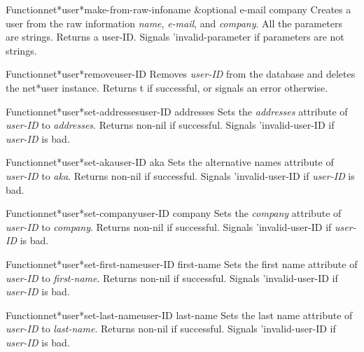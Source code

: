 \begin{functiondoc}{Function}{net*user*make-from-raw-info}{name \&optional e-mail company}
Creates a user from the raw information {\em name}, {\em e-mail}, and {\em company}.
All the parameters are strings.
Returns a user-ID.
Signals 'invalid-parameter if parameters are not strings.
\end{functiondoc}

\begin{functiondoc}{Function}{net*user*remove}{user-ID}
Removes {\em user-ID} from the database and deletes the net*user instance.
Returns t if successful, or signals an error otherwise.
\end{functiondoc}

\begin{functiondoc}{Function}{net*user*set-addresses}{user-ID addresses}
Sets the {\em addresses} attribute of {\em user-ID} to {\em addresses}.
Returns non-nil if successful. Signals 'invalid-user-ID if {\em user-ID} is bad.
\end{functiondoc}

\begin{functiondoc}{Function}{net*user*set-aka}{user-ID aka}
Sets the alternative names attribute of {\em user-ID} to {\em aka}.
Returns non-nil if successful. Signals 'invalid-user-ID if {\em user-ID} is bad.
\end{functiondoc}

\begin{functiondoc}{Function}{net*user*set-company}{user-ID company}
Sets the {\em company} attribute of {\em user-ID} to {\em company}.
Returns non-nil if successful. Signals 'invalid-user-ID if {\em user-ID} is bad.
\end{functiondoc}

\begin{functiondoc}{Function}{net*user*set-first-name}{user-ID first-name}
Sets the first name attribute of {\em user-ID} to {\em first-name}.
Returns non-nil if successful. Signals 'invalid-user-ID if {\em user-ID} is bad.
\end{functiondoc}

\begin{functiondoc}{Function}{net*user*set-last-name}{user-ID last-name}
Sets the last name attribute of {\em user-ID} to {\em last-name}.
Returns non-nil if successful. Signals 'invalid-user-ID if {\em user-ID} is bad.
\end{functiondoc}

